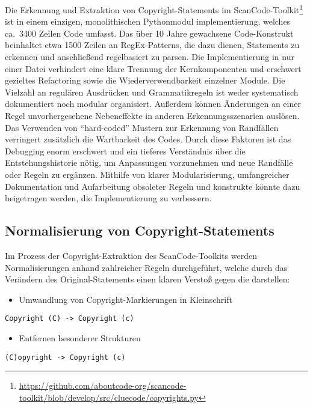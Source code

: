 Die Erkennung und Extraktion von Copyright-Statements im ScanCode-Toolkit\footnote{\url{https://github.com/aboutcode-org/scancode-toolkit/blob/develop/src/cluecode/copyrights.py}} ist in einem einzigen, monolithischen Pythonmodul implementierung, welches ca.\ \num{3400} Zeilen Code umfasst.
Das über \num{10} Jahre gewachsene Code-Konstrukt beinhaltet etwa \num{1500} Zeilen an RegEx-Patterns, die dazu dienen, Statements zu erkennen und anschließend regelbasiert zu parsen.
Die Implementierung in nur einer Datei verhindert eine klare Trennung der Kernkomponenten und erschwert gezieltes Refactoring sowie die Wiederverwendbarkeit einzelner Module.
Die Vielzahl an regulären Ausdrücken und Grammatikregeln ist weder systematisch dokumentiert noch modular organisiert.
Außerdem können Änderungen an einer Regel unvorhergesehene Nebeneffekte in anderen Erkennungsszenarien auslösen.
Das Verwenden von \enquote{hard-coded} Mustern zur Erkennung von Randfällen verringert zusätzlich die Wartbarkeit des Codes.
Durch diese Faktoren ist das Debugging enorm erschwert und ein tieferes Verständnis über die Entstehungshistorie nötig, um Anpassungen vorzunehmen und neue Randfälle oder Regeln zu ergänzen.
Mithilfe von klarer Modularisierung, umfangreicher Dokumentation und Aufarbeitung obsoleter Regeln und konstrukte könnte dazu beigetragen werden, die Implementierung zu verbessern.


\subsection{Normalisierung von Copyright-Statements}

Im Prozess der Copyright-Extraktion des ScanCode-Toolkits werden Normalisierungen anhand zahlreicher Regeln durchgeführt, welche durch das Verändern des Original-Statements einen klaren Verstoß gegen die  darstellen:

\begin{itemize}
    \item Umwandlung von Copyright-Markierungen in Kleinschrift
\end{itemize}
\begin{lstlisting}[numbers=none, keepspaces=true]
Copyright (C) -> Copyright (c)
\end{lstlisting}

\begin{itemize}
    \item Entfernen besonderer Strukturen
\end{itemize}
\begin{lstlisting}[numbers=none, keepspaces=true]
(C)opyright -> Copyright (c)
\end{lstlisting}

